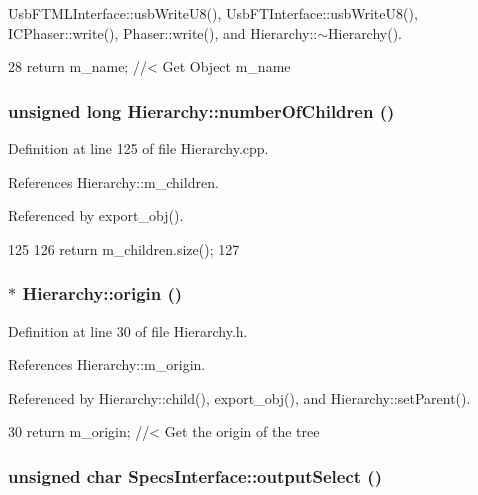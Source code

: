 UsbFTMLInterface::usbWriteU8(), UsbFTInterface::usbWriteU8(), ICPhaser::write(), Phaser::write(), and Hierarchy::$\sim$Hierarchy().


\begin{DoxyCode}
28 { return m_name; } //< Get Object m_name
\end{DoxyCode}
\hypertarget{classHierarchy_ab16e84de65fd84e14001a6cf941c8be4}{
\subsubsection[{numberOfChildren}]{\setlength{\rightskip}{0pt plus 5cm}unsigned long Hierarchy::numberOfChildren ()}}
\label{classHierarchy_ab16e84de65fd84e14001a6cf941c8be4}


Definition at line 125 of file Hierarchy.cpp.

References Hierarchy::m\_\-children.

Referenced by export\_\-obj().


\begin{DoxyCode}
125                                            {
126   return m_children.size();
127 }
\end{DoxyCode}
\hypertarget{classHierarchy_aee461dc930ce3871636ff87f075b1b83}{
\subsubsection[{origin}]{$\ast$ Hierarchy::origin ()}}
\label{classHierarchy_aee461dc930ce3871636ff87f075b1b83}


Definition at line 30 of file Hierarchy.h.

References Hierarchy::m\_\-origin.

Referenced by Hierarchy::child(), export\_\-obj(), and Hierarchy::setParent().


\begin{DoxyCode}
30 { return m_origin; }  //< Get the origin of the tree
\end{DoxyCode}
\hypertarget{classSpecsInterface_ab291ed03f4c2f0143e14c26ad5f648dd}{
\subsubsection[{outputSelect}]{\setlength{\rightskip}{0pt plus 5cm}unsigned char SpecsInterface::outputSelect ()}}
\label{classSpecsInterface_ab291ed03f4c2f0143e14c26ad5f648dd}


